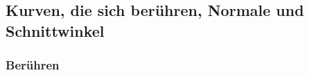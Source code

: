 \subsection{Kurven, die sich berühren, Normale und Schnittwinkel}
\label{Winkel}
\subsubsection{Berühren}


